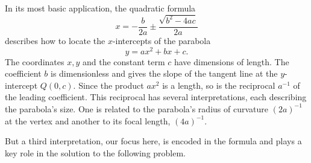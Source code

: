 \documentclass{ximera}
\begin{document}

In its most basic application, the quadratic formula
\[
   x = -\frac{b}{2a}\pm \frac{\sqrt{b^2-4ac}}{2a}
\]
describes how to locate the $x$-intercepts of the parabola 
\begin{equation}
 y=ax^2+bx+c.   \label{Eq:Parabola}
 \end{equation}
 The coordinates $x,y$ and the constant term $c$ have dimensions of length. The coefficient $b$ is dimensionless and gives the slope of the tangent line at the $y$-intercept $Q(0,c)$. Since the product $ax^2$ is a length, so is the reciprocal $a^{-1}$ of the leading coefficient. This reciprocal has several interpretations, each describing the parabola's size. One is related to the parabola's radius of curvature $(2a)^{-1}$ at the vertex and another to its focal length, $(4a)^{-1}$. 

But a third interpretation, our focus here, is encoded in the formula and plays a key role in the solution to the following problem.
\end{document}
